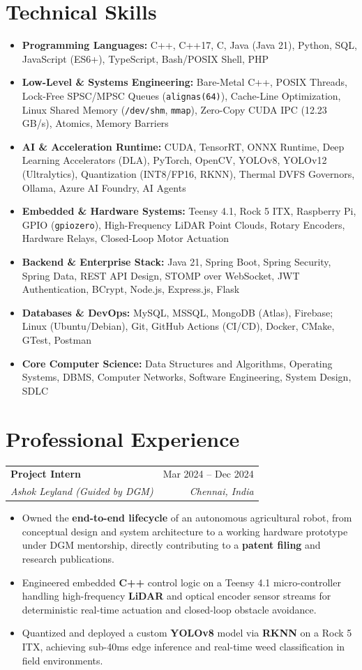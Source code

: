 \documentclass[10pt,a4paper]{article}
\makeatletter
\newcommand{\resumeItem}[1]{\item{\small #1}}
\newcommand{\resumeSubheading}[4]{
\begin{tabular*}{\textwidth}{@{}l@{\extracolsep{\fill}}r@{}}
  \textbf{\small #1} & \small #2 \\
  \textit{\small #3} & \textit{\small #4} \\
\end{tabular*}\vspace{2.5pt}
}
\makeatother
\begin{document}
\section*{Technical Skills}
\begin{itemize}
    \item \textbf{Programming Languages:} C++, C++17, C, Java (Java 21), Python, SQL, JavaScript (ES6+), TypeScript, Bash/POSIX Shell, PHP
    \item \textbf{Low-Level \& Systems Engineering:} Bare-Metal C++, POSIX Threads, Lock-Free SPSC/MPSC Queues (\texttt{alignas(64)}), Cache-Line Optimization, Linux Shared Memory (\texttt{/dev/shm}, \texttt{mmap}), Zero-Copy CUDA IPC (12.23 GB/s), Atomics, Memory Barriers
    \item \textbf{AI \& Acceleration Runtime:} CUDA, TensorRT, ONNX Runtime, Deep Learning Accelerators (DLA), PyTorch, OpenCV, YOLOv8, YOLOv12 (Ultralytics), Quantization (INT8/FP16, RKNN), Thermal DVFS Governors, Ollama, Azure AI Foundry, AI Agents
    \item \textbf{Embedded \& Hardware Systems:} Teensy 4.1, Rock 5 ITX, Raspberry Pi, GPIO (\texttt{gpiozero}), High-Frequency LiDAR Point Clouds, Rotary Encoders, Hardware Relays, Closed-Loop Motor Actuation
    \item \textbf{Backend \& Enterprise Stack:} Java 21, Spring Boot, Spring Security, Spring Data, REST API Design, STOMP over WebSocket, JWT Authentication, BCrypt, Node.js, Express.js, Flask
    \item \textbf{Databases \& DevOps:} MySQL, MSSQL, MongoDB (Atlas), Firebase; Linux (Ubuntu/Debian), Git, GitHub Actions (CI/CD), Docker, CMake, GTest, Postman
    \item \textbf{Core Computer Science:} Data Structures and Algorithms, Operating Systems, DBMS, Computer Networks, Software Engineering, System Design, SDLC
\end{itemize}

\section*{Professional Experience}

\resumeSubheading
  {Project Intern}{Mar 2024 -- Dec 2024}
  {Ashok Leyland (Guided by DGM)}{Chennai, India}
\begin{itemize}
    \resumeItem{Owned the \textbf{end-to-end lifecycle} of an autonomous agricultural robot, from conceptual design and system architecture to a working hardware prototype under DGM mentorship, directly contributing to a \textbf{patent filing} and research publications.}
    \resumeItem{Engineered embedded \textbf{C++} control logic on a Teensy 4.1 micro-controller handling high-frequency \textbf{LiDAR} and optical encoder sensor streams for deterministic real-time actuation and closed-loop obstacle avoidance.}
    \resumeItem{Quantized and deployed a custom \textbf{YOLOv8} model via \textbf{RKNN} on a Rock 5 ITX, achieving sub-40ms edge inference and real-time weed classification in field environments.}
\end{itemize}
\end{document}
